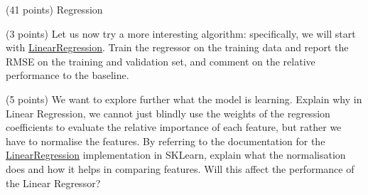 \documentclass[12pt]{article}
\begin{document}
\begin{question}{\label{Q_LR_BA}(41 points) Regression}
\begin{subquestion}
\end{subquestion}

\begin{subquestion}{(3 points) Let us now try a more interesting algorithm: specifically, we will start with \href{https://scikit-learn.org/stable/modules/generated/sklearn.linear_model.LinearRegression.html}{LinearRegression}. Train the regressor on the training data and report the RMSE on the training and validation set, and comment on the relative performance to the baseline.}






\end{subquestion}



\begin{subquestion}{(5 points) We want to explore further what the model is learning. Explain why in Linear Regression, we cannot just blindly use the weights of the regression coefficients to evaluate the relative importance of each feature, but rather we have to normalise the features. By referring to the documentation for the \href{http://scikit-learn.org/stable/modules/generated/sklearn.linear_model.LinearRegression.html}{LinearRegression} implementation in SKLearn, explain what the normalisation does and how it helps in comparing features. Will this affect the performance of the Linear Regressor?}






\end{subquestion}


\end{question}
\end{document}
